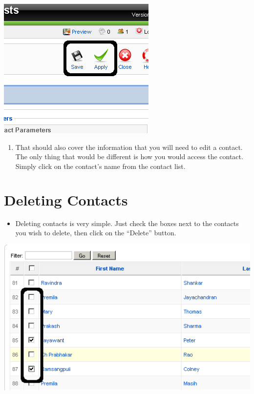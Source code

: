 \documentclass[letterpaper,10pt,english]{manual}
\begin{document}
{\hfill\includegraphics{directoryContactsSaveApply1.png}\hfill}
\begin{enumerate}
\item {} 
That should also cover the information that you will need to edit a contact.  The only thing that would be different is how you would access the contact.  Simply click on the contact's name from the contact list.

\end{enumerate}

\section{Deleting Contacts}
\begin{itemize}
\item {} 
Deleting contacts is very simple.  Just check the boxes next to the contacts you wish to delete, then click on the “Delete” button.

\end{itemize}

{\hfill\includegraphics{directoryContactsDelete1.png}\hfill}
\end{document}
